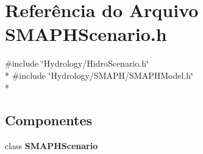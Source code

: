 \section{Referência do Arquivo S\+M\+A\+P\+H\+Scenario.\+h}
\label{_s_m_a_p_h_scenario_8h}
{\ttfamily \#include \char`\"{}Hydrology/\+Hidro\+Scenario.\+h\char`\"{}}\\*
{\ttfamily \#include \char`\"{}Hydrology/\+S\+M\+A\+P\+H/\+S\+M\+A\+P\+H\+Model.\+h\char`\"{}}\\*
\subsection*{Componentes}
\begin{DoxyCompactItemize}
\item 
class {\bf S\+M\+A\+P\+H\+Scenario}
\end{DoxyCompactItemize}
